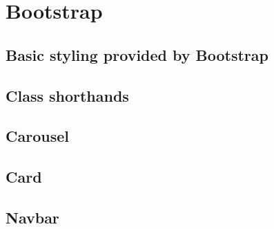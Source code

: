 \chapter{Bootstrap}

\section{Basic styling provided by Bootstrap}

\section{Class shorthands}

\section{Carousel}

\section{Card}

\section{Navbar}
